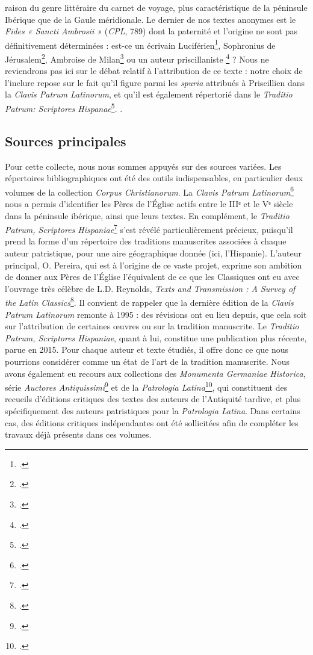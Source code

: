 \documentclass[a4paper,twoside,12pt]{book}
\begin{document}
raison du genre littéraire du carnet de voyage, plus caractéristique de la péninsule Ibérique que de la Gaule méridionale. Le dernier de nos textes anonymes est le \textit{Fides « Sancti Ambrosii »} (\textit{CPL}, 789) dont la paternité et l'origine ne sont pas définitivement déterminées : est-ce un écrivain Luciférien\footcite[p. 716]{Quesnel}, Sophronius de Jérusalem\footcite[p. 56--57]{Friedich}, Ambroise de Milan\footcite[p. 18--20]{Guericke} ou un auteur priscillaniste \footcite[p. 58--67]{Künstle} ? Nous ne reviendrons pas ici sur le débat relatif à l’attribution de ce texte : notre choix de l’inclure repose sur le fait qu’il figure parmi les \textit{spuria} attribués à Priscillien dans la \textit{Clavis Patrum Latinorum}, et qu’il est également répertorié dans le \textit{Traditio Patrum: Scriptores Hispanae}\footcite[p. 223--258]{TradPat}.
. 



\subsection{Sources principales}
Pour cette collecte, nous nous sommes appuyés sur des sources variées. Les répertoires bibliographiques ont été des outils indispensables, en particulier deux volumes de la collection \textit{Corpus Christianorum}. La \textit{Clavis Patrum Latinorum}\footcite{CPL}
nous a permis d’identifier les Pères de l’Église actifs entre le IIIᵉ et le Vᵉ siècle dans la péninsule ibérique, ainsi que leurs textes. En complément, le \textit{Traditio Patrum, Scriptores Hispaniae}\footcite{TradPat} s’est révélé particulièrement précieux, puisqu’il prend la forme d’un répertoire des traditions manuscrites associées à chaque auteur patristique, pour une aire géographique donnée (ici, l'Hispanie). L’auteur principal, O. Pereira, qui est à l’origine de ce vaste projet, exprime son ambition de donner aux Pères de l’Église l’équivalent de ce que les Classiques ont eu avec l’ouvrage très célèbre de L.D. Reynolds, \textit{Texts and Transmission : A Survey of the Latin Classics}\footcite{Reynolds}. Il convient de rappeler que la dernière édition de la \textit{Clavis Patrum Latinorum} remonte à 1995 : des révisions ont eu lieu depuis, que cela soit sur l’attribution de certaines œuvres ou sur la tradition manuscrite. Le  \textit{Traditio Patrum, Scriptores Hispaniae}, quant à lui, constitue une publication plus récente, parue en 2015. Pour chaque auteur et texte étudiés, il offre donc ce que nous pourrions considérer comme un état de l’art de la tradition manuscrite. Nous avons également eu recours aux collections des \textit{Monumenta Germaniae Historica}, série \textit{Auctores Antiquissimi}\footcite{MGH2,MGH14} et de la \textit{Patrologia Latina}\footcite{migneCollection}, qui constituent des recueils d’éditions critiques des textes des auteurs de l’Antiquité tardive, et plus spécifiquement des auteurs patristiques pour la \textit{Patrologia Latina}. Dans certains cas, des éditions critiques indépendantes ont été sollicitées afin de compléter les travaux déjà présents dans ces volumes.
\end{document}

